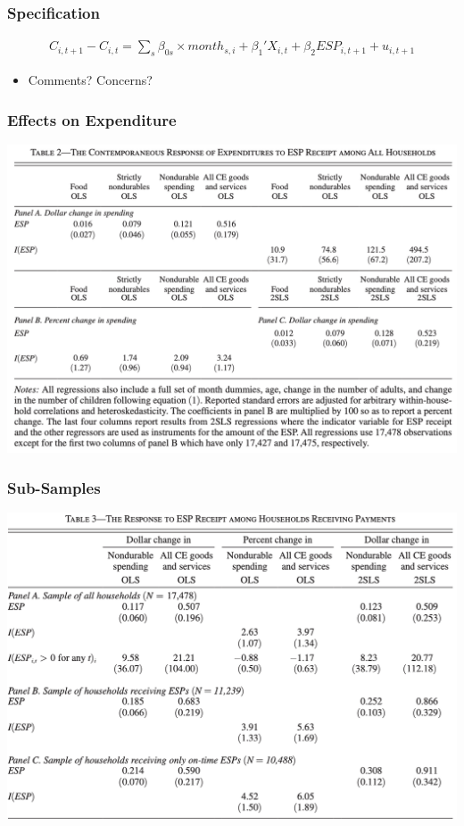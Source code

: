 \documentclass[english,xcolor=svgnames]{beamer}
\begin{document}
\begin{frame}
\frametitle[alignment=center]{Specification}
\begin{align*}
	C_{i,t+1}-C_{i,t} = \sum_s \beta_{0s} \times month_{s,i} + \beta_1'X_{i,t} + \beta_2 ESP_{i,t+1} + u_{i,t+1}
\end{align*}
\begin{itemize}
	\item Comments? Concerns?
\end{itemize}
\end{frame}

\begin{frame}
\frametitle[alignment=center]{Effects on Expenditure}
\centering
\includegraphics[scale=0.6]{figures/PSMJTAB2.png}
\end{frame}

\begin{frame}
\frametitle[alignment=center]{Sub-Samples}
\centering
\includegraphics[scale=0.6]{figures/PSMJTAB3.png}
\end{frame}
\end{document}
